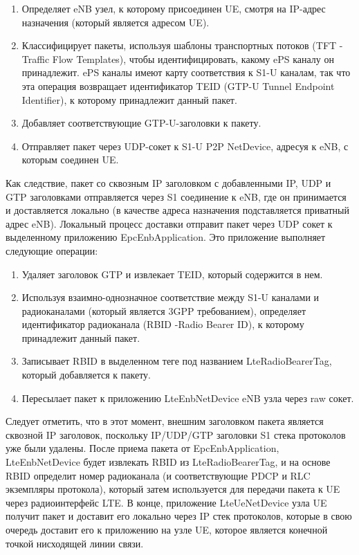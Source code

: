 \begin{enumerate}
  \item Определяет eNB узел, к которому присоединен UE, смотря на IP-адрес назначения (который является адресом UE).
  \item Классифицирует пакеты, используя шаблоны транспортных потоков (TFT - Traffic Flow Templates), чтобы идентифицировать, какому ePS каналу он принадлежит. ePS каналы имеют карту соответствия к S1-U каналам, так что эта операция возвращает идентификатор TEID (GTP-U Tunnel Endpoint Identifier), к которому принадлежит данный пакет.
  \item Добавляет соответствующие GTP-U-заголовки к пакету.
  \item Отправляет пакет через UDP-сокет к S1-U P2P NetDevice, адресуя к eNB, с которым соединен UE.
\end{enumerate}

Как следствие, пакет со сквозным IP заголовком с добавленными IP, 
UDP и GTP заголовками отправляется через S1 соединение к eNB, 
где он принимается и доставляется локально (в качестве адреса назначения подставляется приватный адрес eNB). Локальный процесс доставки отправит пакет через UDP сокет к выделенному приложению EpcEnbApplication. 
Это приложение выполняет следующие операции:

\begin{enumerate}
  \item Удаляет заголовок GTP и извлекает TEID, который содержится в нем.
  \item Используя взаимно-однозначное соответствие между S1-U каналами и радиоканалами (который является 3GPP требованием), определяет идентификатор радиоканала (RBID -Radio Bearer ID), к которому принадлежит данный пакет.
  \item Записывает RBID в выделенном теге под названием LteRadioBearerTag, который добавляется к пакету.
  \item Пересылает пакет к приложению LteEnbNetDevice eNB узла через raw сокет.
\end{enumerate}
Следует отметить, что в этот момент, внешним заголовком пакета является сквозной IP заголовок, поскольку IP/UDP/GTP заголовки S1 стека протоколов уже были удалены. 
После приема пакета от EpcEnbApplication, LteEnbNetDevice будет извлекать RBID из LteRadioBearerTag, и на основе RBID определит номер радиоканала (и соответствующие PDCP и RLC экземпляры протокола), 
который затем используется для передачи пакета к UE через радиоинтерфейс LTE. 
В конце, приложение LteUeNetDevice узла UE получит пакет и доставит его локально через IP стек протоколов, 
которые в свою очередь доставит его к приложению на узле UE, которое является конечной точкой нисходящей линии связи.

